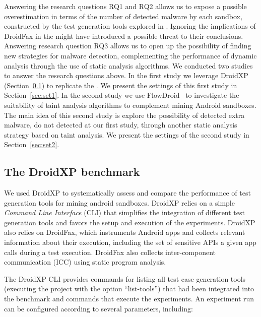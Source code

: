 Answering the research questions RQ1 and RQ2 allows us to expose a possible overestimation in terms of the number of detected malware by each sandbox, constructed by the test
generation tools explored in \blls. Ignoring the implications of DroidFax in the \blls might have introduced a possible threat to their conclusions. Answering research question RQ3
allows us to open up the possibility of finding new strategies for malware detection, complementing the performance of
dynamic analysis through the use of static analysis algorithms.
We conducted two studies to answer the research questions above. In the
first study we leverage DroidXP~\cite{DBLP:conf/scam/CostaMCMVBC20} (Section~\ref{sec:droidxp}) to replicate
the \blls. We present the settings of this first study in Section~\ref{sec:set1}.
In the second study we use
FlowDroid~\cite{DBLP:conf/pldi/ArztRFBBKTOM14} to investigate the 
suitability of taint analysis algorithms to complement mining Android sandboxes. The main idea of this second study is explore the possibility of detected extra malware, do not detected at our first study, through another static analysis strategy based on taint analysis. We present the settings of the second study in Section~\ref{sec:set2}. 


\subsection{The DroidXP benchmark}\label{sec:droidxp}

We used DroidXP to systematically assess and compare the performance of test generation tools for mining android sandboxes. DroidXP relies on a
simple \emph{Command Line Interface} (CLI) that simplifies the integration of different test generation tools and favors the setup and execution 
of the experiments. DroidXP also relies on DroidFax, which instruments Android apps and collects relevant information about
their execution, including the set of sensitive APIs a given
app calls during a test execution. DroidFax also collects inter-component communication (ICC) using  static
program analysis.


The DroidXP CLI provides commands for listing all test case
generation tools (executing the project with the option ``list-tools'') that had been
integrated into the benchmark and commands that execute the experiments. An
experiment run can be configured according to several parameters, including:


